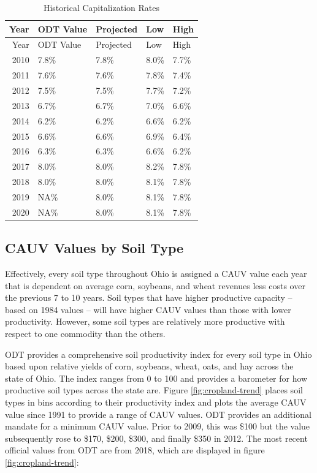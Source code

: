 \documentclass[]{article}
\begin{document}
\begin{longtable}[]{@{}rllll@{}}
\caption{Historical Capitalization Rates}\tabularnewline
\toprule
Year & ODT Value & Projected & Low & High\tabularnewline
\midrule
\endfirsthead
\toprule
Year & ODT Value & Projected & Low & High\tabularnewline
\midrule
\endhead
2010 & 7.8\% & 7.8\% & 8.0\% & 7.7\%\tabularnewline
2011 & 7.6\% & 7.6\% & 7.8\% & 7.4\%\tabularnewline
2012 & 7.5\% & 7.5\% & 7.7\% & 7.2\%\tabularnewline
2013 & 6.7\% & 6.7\% & 7.0\% & 6.6\%\tabularnewline
2014 & 6.2\% & 6.2\% & 6.6\% & 6.2\%\tabularnewline
2015 & 6.6\% & 6.6\% & 6.9\% & 6.4\%\tabularnewline
2016 & 6.3\% & 6.3\% & 6.6\% & 6.2\%\tabularnewline
2017 & 8.0\% & 8.0\% & 8.2\% & 7.8\%\tabularnewline
2018 & 8.0\% & 8.0\% & 8.1\% & 7.8\%\tabularnewline
2019 & NA\% & 8.0\% & 8.1\% & 7.8\%\tabularnewline
2020 & NA\% & 8.0\% & 8.1\% & 7.8\%\tabularnewline
\bottomrule
\end{longtable}

\hypertarget{cauv-values-by-soil-type}{%
\subsection{CAUV Values by Soil Type}\label{cauv-values-by-soil-type}}

Effectively, every soil type throughout Ohio is assigned a CAUV value
each year that is dependent on average corn, soybeans, and wheat
revenues less costs over the previous 7 to 10 years. Soil types that
have higher productive capacity -- based on 1984 values -- will have
higher CAUV values than those with lower productivity. However, some
soil types are relatively more productive with respect to one commodity
than the others.

ODT provides a comprehensive soil productivity index for every soil type
in Ohio based upon relative yields of corn, soybeans, wheat, oats, and
hay across the state of Ohio. The index ranges from 0 to 100 and
provides a barometer for how productive soil types across the state are.
Figure \ref{fig:cropland-trend} places soil types in bins according to
their productivity index and plots the average CAUV value since 1991 to
provide a range of CAUV values. ODT provides an additional mandate for a
minimum CAUV value. Prior to 2009, this was \$100 but the value
subsequently rose to \$170, \$200, \$300, and finally \$350 in 2012. The
most recent official values from ODT are from 2018, which are displayed
in figure \ref{fig:cropland-trend}:
\end{document}
